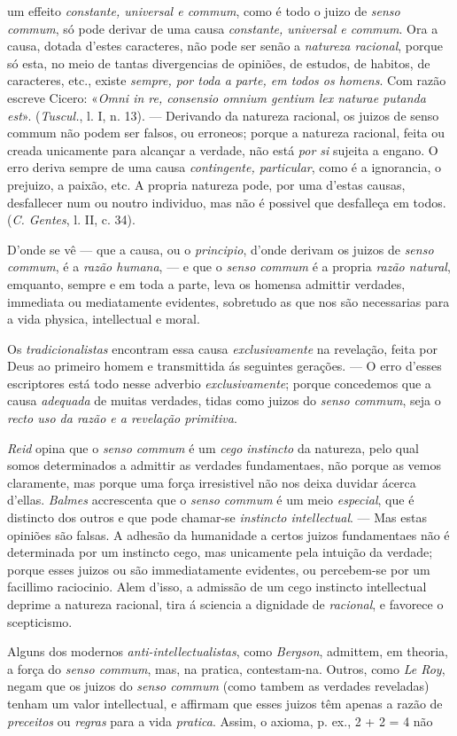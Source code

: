 um effeito \emph{constante, universal e commum}, como é todo o juizo de \emph{senso commum}, só pode derivar de uma causa \emph{constante, universal e commum}. Ora a causa, dotada d'estes caracteres, não pode ser senão a \emph{natureza racional}, porque só esta, no meio de tantas divergencias de opiniões, de estudos, de habitos, de caracteres, etc., existe \emph{sempre, por toda a parte, em todos os homens}. Com razão escreve Cicero: «\emph{Omni in re, consensio omnium gentium lex naturae putanda est}». (\emph{Tuscul.}, l. I, n. 13). --- Derivando da natureza racional, os juizos de senso commum não podem ser falsos, ou erroneos; porque a natureza racional, feita ou creada unicamente para alcançar a verdade, não está \emph{por si} sujeita a engano. O erro deriva sempre de uma causa \emph{contingente, particular}, como é a ignorancia, o prejuizo, a paixão, etc. A propria natureza pode, por uma d'estas causas, desfallecer num ou noutro individuo, mas não é possivel que desfalleça em todos. (\emph{C. Gentes}, l. II, c. 34).\par D'onde se vê --- que a causa, ou o \emph{principio}, d'onde derivam os juizos de \emph{senso commum}, é a \emph{razão humana}, --- e que o \emph{senso commum} é a propria \emph{razão natural}, emquanto, sempre e em toda a parte, leva os homensa admittir verdades, immediata ou mediatamente evidentes, sobretudo as que nos são necessarias para a vida physica, intellectual e moral.\par Os \emph{tradicionalistas} encontram essa causa \emph{exclusivamente} na revelação, feita por Deus ao primeiro homem e transmittida ás seguintes gerações. --- O erro d'esses escriptores está todo nesse adverbio \emph{exclusivamente}; porque concedemos que a causa \emph{adequada} de muitas verdades, tidas como juizos do \emph{senso commum}, seja o \emph{recto uso da razão e a revelação primitiva}.\par \emph{Reid} opina que o \emph{senso commum} é um \emph{cego instincto} da natureza, pelo qual somos determinados a admittir as verdades fundamentaes, não porque as vemos claramente, mas porque uma força irresistivel não nos deixa duvidar ácerca d'ellas. \emph{Balmes} accrescenta que o \emph{senso commum} é um meio \emph{especial}, que é distincto dos outros e que pode chamar-se \emph{instincto intellectual}. --- Mas estas opiniões são falsas. A adhesão da humanidade a certos juizos fundamentaes não é determinada por um instincto cego, mas unicamente pela intuição da verdade; porque esses juizos ou são immediatamente evidentes, ou percebem-se por um facillimo raciocinio. Alem d'isso, a admissão de um cego instincto intellectual deprime a natureza racional, tira á sciencia a dignidade de \emph{racional}, e favorece o scepticismo.\par Alguns dos modernos \emph{anti-intellectualistas}, como \emph{Bergson}, admittem, em theoria, a força do \emph{senso commum}, mas, na pratica, contestam-na. Outros, como \emph{Le Roy}, negam que os juizos do \emph{senso commum} (como tambem as verdades reveladas) tenham um valor intellectual, e affirmam que esses juizos têm apenas a razão de \emph{preceitos} ou \emph{regras} para a vida \emph{pratica}. Assim, o axioma, p. ex., 2 + 2 = 4 não 